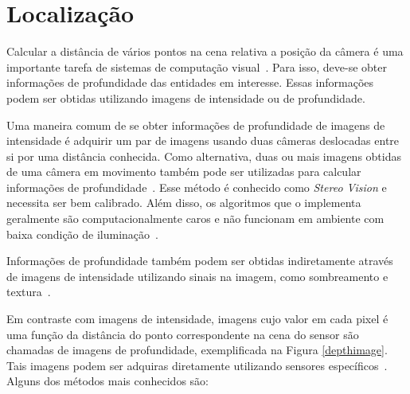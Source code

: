 \section{Localização}
\label{sec:luz-estruturada}

	Calcular a distância de vários pontos na cena relativa a posição da câmera é uma
	importante tarefa de sistemas de computação visual~\cite{jain}. Para isso,
	deve-se obter informações de profundidade das entidades em interesse. Essas
	informações podem ser obtidas utilizando imagens de intensidade ou de
	profundidade.
	
	Uma maneira comum de se obter informações de profundidade de imagens de
	intensidade é adquirir um par de imagens usando duas câmeras deslocadas entre si
	por uma distância conhecida. Como alternativa, duas ou mais imagens obtidas de
	uma câmera em movimento também pode ser utilizadas para calcular informações de
	profundidade~\cite{jain}. Esse método é conhecido como \textit{Stereo Vision} e
	necessita ser bem calibrado.  Além disso, os algoritmos que o implementa
	geralmente são computacionalmente caros e não funcionam em ambiente com baixa
	condição de iluminação~\cite{fall-detection}.
	
	Informações de profundidade também podem ser obtidas indiretamente através de
	imagens de intensidade utilizando sinais na imagem, como sombreamento e
	textura~\cite{jain}.
	
	Em contraste com imagens de intensidade, imagens cujo valor em cada pixel é uma
	função da distância do ponto correspondente na cena do sensor são chamadas de
	imagens de profundidade, exemplificada na Figura \ref{depthimage}. Tais imagens
	podem ser adquiras diretamente utilizando sensores específicos~\cite{jain}.
	Alguns dos métodos mais conhecidos são:


